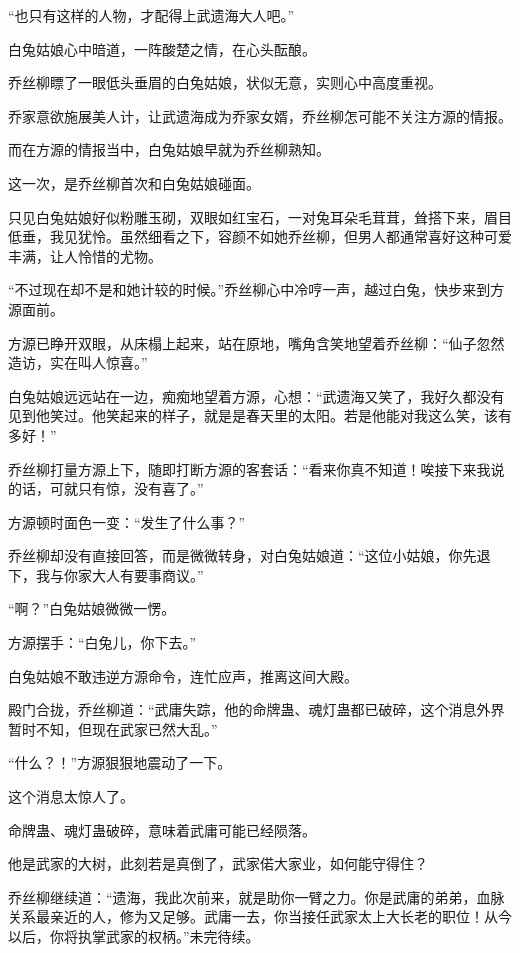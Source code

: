 \begin{this_body}
“也只有这样的人物，才配得上武遗海大人吧。”

白兔姑娘心中暗道，一阵酸楚之情，在心头酝酿。

乔丝柳瞟了一眼低头垂眉的白兔姑娘，状似无意，实则心中高度重视。

乔家意欲施展美人计，让武遗海成为乔家女婿，乔丝柳怎可能不关注方源的情报。

而在方源的情报当中，白兔姑娘早就为乔丝柳熟知。

这一次，是乔丝柳首次和白兔姑娘碰面。

只见白兔姑娘好似粉雕玉砌，双眼如红宝石，一对兔耳朵毛茸茸，耸搭下来，眉目低垂，我见犹怜。虽然细看之下，容颜不如她乔丝柳，但男人都通常喜好这种可爱丰满，让人怜惜的尤物。

“不过现在却不是和她计较的时候。”乔丝柳心中冷哼一声，越过白兔，快步来到方源面前。

方源已睁开双眼，从床榻上起来，站在原地，嘴角含笑地望着乔丝柳：“仙子忽然造访，实在叫人惊喜。”

白兔姑娘远远站在一边，痴痴地望着方源，心想：“武遗海又笑了，我好久都没有见到他笑过。他笑起来的样子，就是是春天里的太阳。若是他能对我这么笑，该有多好！”

乔丝柳打量方源上下，随即打断方源的客套话：“看来你真不知道！唉接下来我说的话，可就只有惊，没有喜了。”

方源顿时面色一变：“发生了什么事？”

乔丝柳却没有直接回答，而是微微转身，对白兔姑娘道：“这位小姑娘，你先退下，我与你家大人有要事商议。”

“啊？”白兔姑娘微微一愣。

方源摆手：“白兔儿，你下去。”

白兔姑娘不敢违逆方源命令，连忙应声，推离这间大殿。

殿门合拢，乔丝柳道：“武庸失踪，他的命牌蛊、魂灯蛊都已破碎，这个消息外界暂时不知，但现在武家已然大乱。”

“什么？！”方源狠狠地震动了一下。

这个消息太惊人了。

命牌蛊、魂灯蛊破碎，意味着武庸可能已经陨落。

他是武家的大树，此刻若是真倒了，武家偌大家业，如何能守得住？

乔丝柳继续道：“遗海，我此次前来，就是助你一臂之力。你是武庸的弟弟，血脉关系最亲近的人，修为又足够。武庸一去，你当接任武家太上大长老的职位！从今以后，你将执掌武家的权柄。”未完待续。

\end{this_body}

